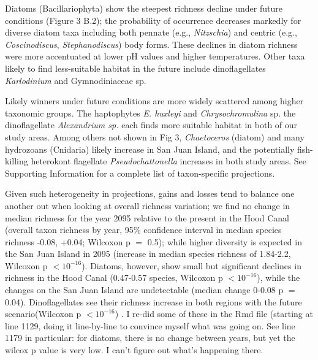 \documentclass[11pt]{article}
\begin{document}
\begin{linenumbers}
Diatoms (Bacillariophyta) show the steepest richness decline under future conditions (Figure 3 B.2); the probability of occurrence decreases markedly for diverse diatom taxa including both pennate (e.g., \textit{Nitzschia}) and centric (e.g., \textit{Coscinodiscus}, \textit{Stephanodiscus}) body forms. These declines in diatom richness were more accentuated at lower pH values and higher temperatures. Other taxa likely to find less-suitable habitat in the future include dinoflagellates \textit{Karlodinium} and Gymnodiniaceae sp.

Likely winners under future conditions are more widely scattered among higher taxonomic groups. The haptophytes \textit{E. huxleyi} and \textit{Chrysochromulina} sp. the dinoflagellate \textit{Alexandrium sp.} each finds more suitable habitat in both of our study areas. Among others not shown in Fig 3, \textit{Chaetoceros} (diatom) and many hydrozoans (Cnidaria) likely increase in San Juan Island, and the potentially fish-killing heterokont flagellate \textit{Pseudochattonella} increases in both study areas. See Supporting Information for a complete list of taxon-specific projections.
 
Given such heterogeneity in projections, gains and losses tend to balance one another out when looking at overall richness variation; {\color{red} we find no change in median richness for the year 2095 relative to the present in the Hood Canal (overall taxon richness by year, 95\% confidence interval in median species richness  -0.08, +0.04; Wilcoxon p $=$ 0.5); while higher diversity is expected in the San Juan Island in 2095 (increase in median species richness of 1.84-2.2, Wilcoxon p $< 10^{-16}$). Diatoms, however, show small but significant declines in richness in the Hood Canal (0.47-0.57 species, Wilcoxon p $< 10^{-16}$), while the changes on the San Juan Island are undetectable (median change 0-0.08 p $=$ 0.04).  Dinoflagellates see their richness increase in both regions with the future scenario(Wilcoxon p $< 10^{-16}$) }.  {\color{blue} I re-did some of these in the Rmd file (starting at line 1129, doing it line-by-line to convince myself what was going on. See line 1179 in particular: for diatoms, there is no change between years, but yet the wilcox p value is very low. I can't figure out what's happening there.}
 


\end{linenumbers}
\end{document}
